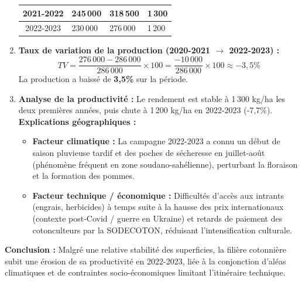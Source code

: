 \documentclass[11pt]{article}
\begin{document}
\begin{exoresolu}
\begin{enumerate}
\begin{center}
\begin{tabularx}{\linewidth}{|c|X|X|X|}
    2021-2022 & 245\,000 & 318\,500 & 1\,300 \\ \hline
    2022-2023 & 230\,000 & 276\,000 & 1\,200 \\ \hline
    \end{tabularx}
    \end{center}
    \item \textbf{Taux de variation de la production (2020-2021 $\to$ 2022-2023) :}
    $$TV = \frac{276\,000 - 286\,000}{286\,000} \times 100 = \frac{-10\,000}{286\,000} \times 100 \approx -3,5\%$$
    La production a baissé de \textbf{3,5\%} sur la période.
    \item \textbf{Analyse de la productivité :}
    Le rendement est stable à 1\,300 kg/ha les deux premières années, puis chute à 1\,200 kg/ha en 2022-2023 (-7,7\%).
    \textbf{Explications géographiques :}
    \begin{itemize}
        \item \textbf{Facteur climatique :} La campagne 2022-2023 a connu un début de saison pluvieuse tardif et des poches de sécheresse en juillet-août (phénomène fréquent en zone soudano-sahélienne), perturbant la floraison et la formation des pommes.
        \item \textbf{Facteur technique / économique :} Difficultés d'accès aux intrants (engrais, herbicides) à temps suite à la hausse des prix internationaux (contexte post-Covid / guerre en Ukraine) et retards de paiement des cotonculteurs par la SODECOTON, réduisant l'intensification culturale.
    \end{itemize}
\end{enumerate}
\textbf{Conclusion :} Malgré une relative stabilité des superficies, la filière cotonnière subit une érosion de sa productivité en 2022-2023, liée à la conjonction d'aléas climatiques et de contraintes socio-économiques limitant l'itinéraire technique.
\end{exoresolu}
\end{document}
